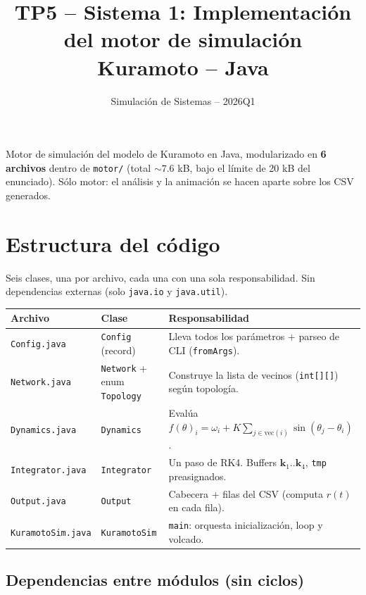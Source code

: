 \documentclass[11pt,a4paper]{article}
\title{\vspace{-1cm}\textbf{TP5 -- Sistema 1: Implementación del motor de simulación}\\[2pt]\large Kuramoto -- Java}
\author{Simulación de Sistemas -- 2026Q1}
\date{}
\begin{document}
\maketitle
\vspace{-0.8cm}

Motor de simulación del modelo de Kuramoto en Java, modularizado en \textbf{6 archivos} dentro de \texttt{motor/} (total $\sim 7.6$ kB, bajo el límite de 20 kB del enunciado). Sólo motor: el análisis y la animación se hacen aparte sobre los CSV generados.

\section{Estructura del código}

Seis clases, una por archivo, cada una con una sola responsabilidad. Sin dependencias externas (solo \texttt{java.io} y \texttt{java.util}).

\begin{center}
\renewcommand{\arraystretch}{1.2}
\begin{tabular}{@{}p{3.4cm} p{2.6cm} p{8.6cm}@{}}
\toprule
\textbf{Archivo} & \textbf{Clase} & \textbf{Responsabilidad} \\
\midrule
\texttt{Config.java} & \texttt{Config} (record) & Lleva todos los parámetros + parseo de CLI (\texttt{fromArgs}). \\
\texttt{Network.java} & \texttt{Network} + enum \texttt{Topology} & Construye la lista de vecinos (\texttt{int[][]}) según topología. \\
\texttt{Dynamics.java} & \texttt{Dynamics} & Evalúa $f(\theta)_i = \omega_i + K\sum_{j\in\text{vec}(i)}\sin(\theta_j-\theta_i)$. \\
\texttt{Integrator.java} & \texttt{Integrator} & Un paso de RK4. Buffers $\mathbf k_1..\mathbf k_4$, \texttt{tmp} preasignados. \\
\texttt{Output.java} & \texttt{Output} & Cabecera + filas del CSV (computa $r(t)$ en cada fila). \\
\texttt{KuramotoSim.java} & \texttt{KuramotoSim} & \texttt{main}: orquesta inicialización, loop y volcado. \\
\bottomrule
\end{tabular}
\end{center}

\subsection*{Dependencias entre módulos (sin ciclos)}
\end{document}
